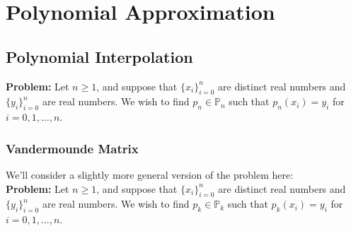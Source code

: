 \documentclass[12pt]{article}
\theoremstyle{definition}
\theoremstyle{definition}
\begin{document}
\section{Polynomial Approximation}
\subsection{Polynomial Interpolation}

\noindent\textbf{Problem:} Let $n\geq 1$, and suppose that $\{x_i\}_{i=0}^n$ are distinct real numbers and $\{y_i\}_{i=0}^n$ are real numbers. We wish to find $p_n \in \mathbb{P}_n$ such that $p_n(x_i) = y_i$ for $i=0,1,\ldots,n$.

\subsubsection{Vandermounde Matrix}

\noindent We'll consider a slightly more general version of the problem here: \\

\noindent\textbf{Problem:} Let $n\geq 1$, and suppose that $\{x_i\}_{i=0}^n$ are distinct real numbers and $\{y_i\}_{i=0}^n$ are real numbers. We wish to find $p_k \in \mathbb{P}_k$ such that $p_k(x_i) = y_i$ for $i=0,1,\ldots,n$. \\
\end{document}
